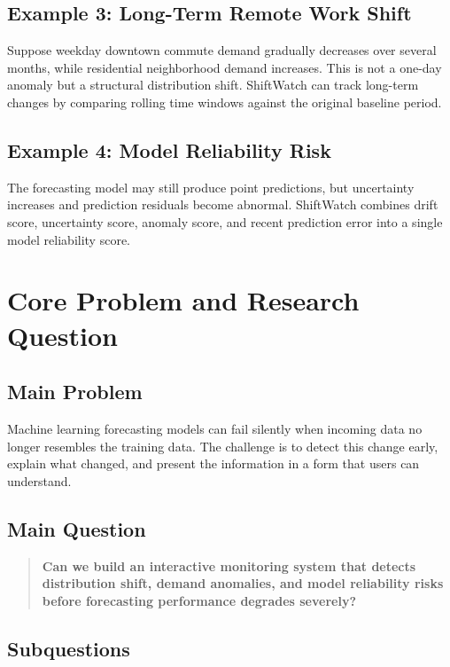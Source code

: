 \documentclass[11pt]{article}
\begin{document}
\subsection{Example 3: Long-Term Remote Work Shift}

Suppose weekday downtown commute demand gradually decreases over several months, while residential neighborhood demand increases. This is not a one-day anomaly but a structural distribution shift. ShiftWatch can track long-term changes by comparing rolling time windows against the original baseline period.

\subsection{Example 4: Model Reliability Risk}

The forecasting model may still produce point predictions, but uncertainty increases and prediction residuals become abnormal. ShiftWatch combines drift score, uncertainty score, anomaly score, and recent prediction error into a single model reliability score.

\section{Core Problem and Research Question}

\subsection{Main Problem}

Machine learning forecasting models can fail silently when incoming data no longer resembles the training data. The challenge is to detect this change early, explain what changed, and present the information in a form that users can understand.

\subsection{Main Question}

\begin{quote}
    \textbf{Can we build an interactive monitoring system that detects distribution shift, demand anomalies, and model reliability risks before forecasting performance degrades severely?}
\end{quote}

\subsection{Subquestions}
\end{document}
